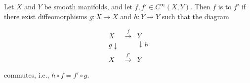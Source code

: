 Let $X$ and $Y$ be smooth manifolds, and let $f, f' \in C^\infty(X, Y)$. Then $f$ is  to $f'$ if there exist diffeomorphisms $g: X \to X$ and $h: Y \to Y$ such that the diagram

$$
\begin{array}{ccc}
X & \xrightarrow{f} & Y \\
{\scriptstyle g}\downarrow & & \downarrow{\scriptstyle h} \\
X & \xrightarrow{f'} & Y
\end{array}
$$

commutes, i.e., $h \circ f = f' \circ g$.
